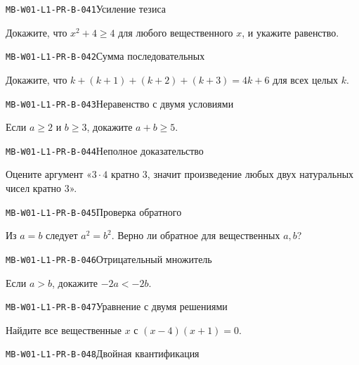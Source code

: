 \documentclass[11pt,a4paper,openany]{book}
\newcommand{\muid}[1]{\texttt{\footnotesize #1}}
\begin{document}
\noindent\hypertarget{MB-W01-L1-PR-B-041}{}\muid{MB-W01-L1-PR-B-041}\quad Усиление тезиса\par

Докажите, что $x^2+4\ge4$ для любого вещественного $x$, и укажите равенство.\par\medskip

\noindent\hypertarget{MB-W01-L1-PR-B-042}{}\muid{MB-W01-L1-PR-B-042}\quad Сумма последовательных\par

Докажите, что $k+(k+1)+(k+2)+(k+3)=4k+6$ для всех целых $k$.\par\medskip

\noindent\hypertarget{MB-W01-L1-PR-B-043}{}\muid{MB-W01-L1-PR-B-043}\quad Неравенство с двумя условиями\par

Если $a\ge2$ и $b\ge3$, докажите $a+b\ge5$.\par\medskip

\noindent\hypertarget{MB-W01-L1-PR-B-044}{}\muid{MB-W01-L1-PR-B-044}\quad Неполное доказательство\par

Оцените аргумент «$3\cdot4$ кратно $3$, значит произведение любых двух натуральных чисел кратно $3$».\par\medskip

\noindent\hypertarget{MB-W01-L1-PR-B-045}{}\muid{MB-W01-L1-PR-B-045}\quad Проверка обратного\par

Из $a=b$ следует $a^2=b^2$. Верно ли обратное для вещественных $a,b$?\par\medskip

\noindent\hypertarget{MB-W01-L1-PR-B-046}{}\muid{MB-W01-L1-PR-B-046}\quad Отрицательный множитель\par

Если $a>b$, докажите $-2a<-2b$.\par\medskip

\noindent\hypertarget{MB-W01-L1-PR-B-047}{}\muid{MB-W01-L1-PR-B-047}\quad Уравнение с двумя решениями\par

Найдите все вещественные $x$ с $(x-4)(x+1)=0$.\par\medskip

\noindent\hypertarget{MB-W01-L1-PR-B-048}{}\muid{MB-W01-L1-PR-B-048}\quad Двойная квантификация\par
\end{document}
